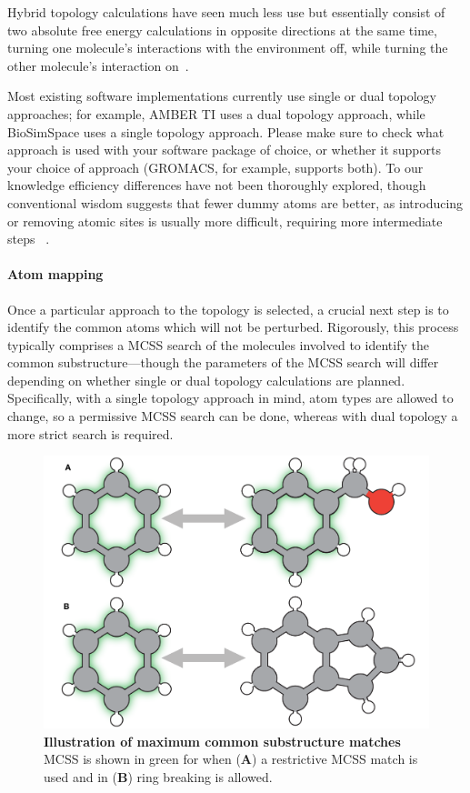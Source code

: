 \documentclass[9pt,bestpractices]{livecoms}
\begin{document}
Hybrid topology calculations have seen much less use but essentially consist of two absolute free energy calculations in opposite directions at the same time, turning one molecule's interactions with the environment off, while turning the other molecule's interaction on~\cite{jiang2019computing, rocklin2013separated}.

Most existing software implementations currently use single or dual topology approaches; for example, AMBER TI uses a dual topology approach, while BioSimSpace uses a single topology approach. Please make sure to check what approach is used with your software package of choice, or whether it supports your choice of approach (GROMACS, for example, supports both). 
To our knowledge efficiency differences have not been thoroughly explored, though conventional wisdom suggests that fewer dummy atoms are better, as introducing or removing atomic sites is usually more difficult, requiring more intermediate steps ~\cite{liu2013lead, mobley2012perspective}.

\paragraph{Atom mapping}
Once a particular approach to the topology is selected, a crucial next step is to identify the common atoms which will not be perturbed.
Rigorously, this process typically comprises a MCSS search of the molecules involved to identify the common substructure---though the parameters of the MCSS search will differ depending on whether single or dual topology calculations are planned.
Specifically, with a single topology approach in mind, atom types are allowed to change, so a permissive MCSS search can be done, whereas with dual topology a more strict search is required.
\begin{figure}
    \includegraphics[width=0.95\linewidth]{figures/fig4_mcs/Figure.pdf}
    \caption{\textbf{Illustration of maximum common substructure matches} MCSS is shown in green for when (\textbf{A}) a restrictive MCSS match is used and in (\textbf{B}) ring breaking is allowed.}
    \label{fig:fig_mcss}
\end{figure} 
\end{document}
